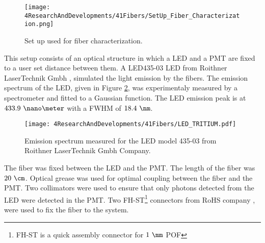 \begin{figure}[h]
\centering
\texttt{[image: 4ResearchAndDevelopments/41Fibers/SetUp\_Fiber\_Characterization.png]}
\caption{Set up used for fiber characterization.\label{fig:SetUpFiberCharacterization}}
\end{figure}

This setup consists of an optical structure in which a LED and a PMT are fixed to a user set distance between them. A LED435-03 LED from Roithner LaserTechnik Gmbh \cite{LEDRLT}, simulated the light emission by the fibers. The emission spectrum of the LED, given in Figure \ref{fig:LEDSpectrumTritium}, was experimentaly measured by a spectrometer and fitted to a Gaussian function. The LED emission peak is at $433.9~\nano\meter$ with a FWHM of $18.4~\nm$. 

\begin{figure}[h]
\centering
\texttt{[image: 4ResearchAndDevelopments/41Fibers/LED\_TRITIUM.pdf]}
\caption{Emission spectrum measured for the LED model 435-03 from Roithner LaserTechnik Gmbh Company.\label{fig:LEDSpectrumTritium}}
\end{figure}

The fiber was fixed between the LED and the PMT. The length of the fiber was $20~\cm$. Optical grease \cite{OpticalGrease} was used for optimal coupling between the fiber and the PMT. Two collimators were used to ensure that only photons detected from the LED were detected in the PMT. Two FH-ST\footnote{FH-ST is a quick assembly connector for $1~\mm$ POF} connectors from RoHS company \cite{}, were used to fix the fiber to the system. 